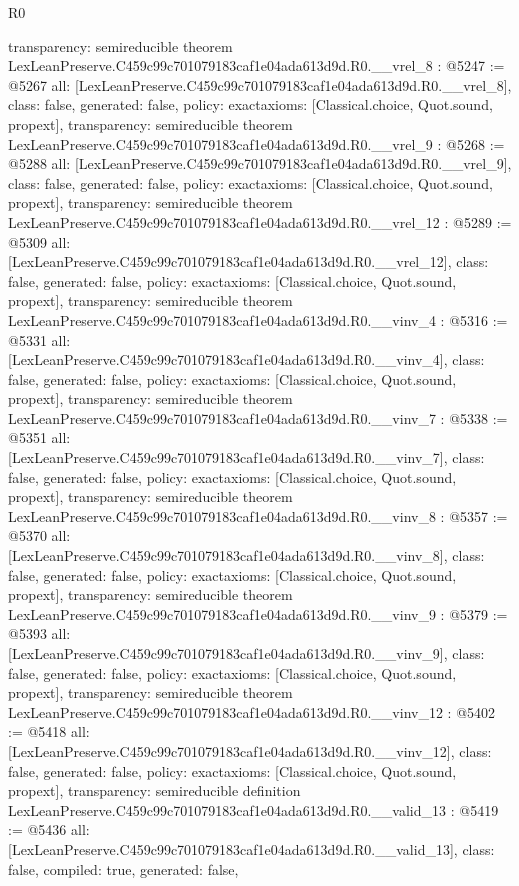 \begin{lexlean}{R0}
\begin{coremodule}
{  transparency: semireducible
}
theorem LexLeanPreserve.C459c99c701079183caf1e04ada613d9d.R0.__vrel_8 : @5247 := @5267 {
  all: [LexLeanPreserve.C459c99c701079183caf1e04ada613d9d.R0.__vrel_8],
  class: false,
  generated: false,
  policy: exact{axioms: [Classical.choice, Quot.sound, propext]},
  transparency: semireducible
}
theorem LexLeanPreserve.C459c99c701079183caf1e04ada613d9d.R0.__vrel_9 : @5268 := @5288 {
  all: [LexLeanPreserve.C459c99c701079183caf1e04ada613d9d.R0.__vrel_9],
  class: false,
  generated: false,
  policy: exact{axioms: [Classical.choice, Quot.sound, propext]},
  transparency: semireducible
}
theorem LexLeanPreserve.C459c99c701079183caf1e04ada613d9d.R0.__vrel_12 : @5289 := @5309 {
  all: [LexLeanPreserve.C459c99c701079183caf1e04ada613d9d.R0.__vrel_12],
  class: false,
  generated: false,
  policy: exact{axioms: [Classical.choice, Quot.sound, propext]},
  transparency: semireducible
}
theorem LexLeanPreserve.C459c99c701079183caf1e04ada613d9d.R0.__vinv_4 : @5316 := @5331 {
  all: [LexLeanPreserve.C459c99c701079183caf1e04ada613d9d.R0.__vinv_4],
  class: false,
  generated: false,
  policy: exact{axioms: [Classical.choice, Quot.sound, propext]},
  transparency: semireducible
}
theorem LexLeanPreserve.C459c99c701079183caf1e04ada613d9d.R0.__vinv_7 : @5338 := @5351 {
  all: [LexLeanPreserve.C459c99c701079183caf1e04ada613d9d.R0.__vinv_7],
  class: false,
  generated: false,
  policy: exact{axioms: [Classical.choice, Quot.sound, propext]},
  transparency: semireducible
}
theorem LexLeanPreserve.C459c99c701079183caf1e04ada613d9d.R0.__vinv_8 : @5357 := @5370 {
  all: [LexLeanPreserve.C459c99c701079183caf1e04ada613d9d.R0.__vinv_8],
  class: false,
  generated: false,
  policy: exact{axioms: [Classical.choice, Quot.sound, propext]},
  transparency: semireducible
}
theorem LexLeanPreserve.C459c99c701079183caf1e04ada613d9d.R0.__vinv_9 : @5379 := @5393 {
  all: [LexLeanPreserve.C459c99c701079183caf1e04ada613d9d.R0.__vinv_9],
  class: false,
  generated: false,
  policy: exact{axioms: [Classical.choice, Quot.sound, propext]},
  transparency: semireducible
}
theorem LexLeanPreserve.C459c99c701079183caf1e04ada613d9d.R0.__vinv_12 : @5402 := @5418 {
  all: [LexLeanPreserve.C459c99c701079183caf1e04ada613d9d.R0.__vinv_12],
  class: false,
  generated: false,
  policy: exact{axioms: [Classical.choice, Quot.sound, propext]},
  transparency: semireducible
}
definition LexLeanPreserve.C459c99c701079183caf1e04ada613d9d.R0.__valid_13 : @5419 := @5436 {
  all: [LexLeanPreserve.C459c99c701079183caf1e04ada613d9d.R0.__valid_13],
  class: false,
  compiled: true,
  generated: false,
}
\end{coremodule}
\end{lexlean}
